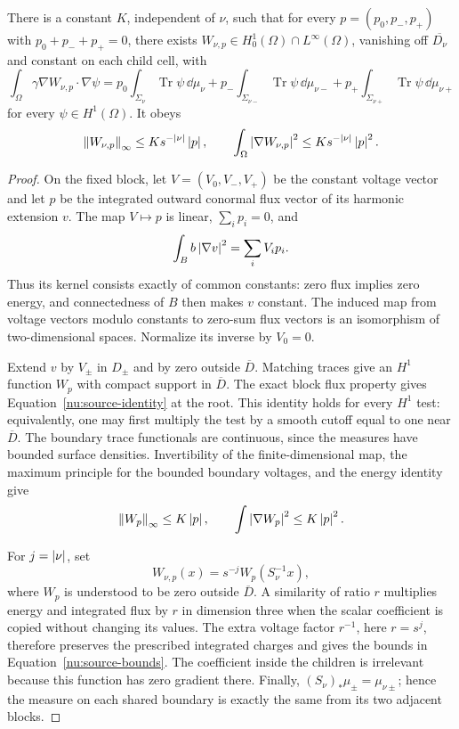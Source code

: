 \begin{lemma}\label{nu:source-lemma}
There is a constant \(K\), independent of \(\nu\), such that for
every \(p=(p_0,p_-,p_+)\) with \(p_0+p_-+p_+=0\), there exists
\(W_{\nu,p}\in H^1_0(\Omega)\cap L^\infty(\Omega)\), vanishing
off \(\overline{D_\nu}\) and constant on each child cell, with
\begin{equation}\label{nu:source-identity}
 \int_\Omega\gamma\nabla W_{\nu,p}\cdot\nabla\psi
 =p_0\int_{\Sigma_\nu}\operatorname{Tr}\psi\,\dd\mu_\nu
  +p_-\int_{\Sigma_{\nu-}}\operatorname{Tr}\psi\,\dd\mu_{\nu-}
  +p_+\int_{\Sigma_{\nu+}}\operatorname{Tr}\psi\,\dd\mu_{\nu+}
\end{equation}
for every \(\psi\in H^1(\Omega)\). It obeys
\begin{equation}\label{nu:source-bounds}
 \left\lVert W_{\nu,p}\right\rVert_\infty\le K s^{-\left\lvert \nu\right\rvert}\left\lvert p\right\rvert,
 \qquad
 \int_\Omega\left\lvert \nabla W_{\nu,p}\right\rvert^2
 \le K s^{-\left\lvert \nu\right\rvert}\left\lvert p\right\rvert^2.
\end{equation}
\end{lemma}

\begin{proof}
On the fixed block, let \(V=(V_0,V_-,V_+)\) be the constant voltage
vector and let \(p\) be the integrated outward conormal flux vector
of its harmonic extension \(v\). The map \(V\mapsto p\) is linear,
\(\sum_i p_i=0\), and
\[
 \int_B b\left\lvert \nabla v\right\rvert^2=\sum_i V_i p_i.
\]
Thus its kernel consists exactly of common constants: zero flux implies
zero energy, and connectedness of \(B\) then makes \(v\) constant.
The induced map from voltage vectors modulo constants to zero-sum flux
vectors is an isomorphism of two-dimensional spaces. Normalize its
inverse by \(V_0=0\).

Extend \(v\) by \(V_\pm\) in \(D_\pm\) and by zero outside
\(\overline D\). Matching traces give an \(H^1\) function
\(W_p\) with compact support in \(\overline D\).
The exact block flux property gives Equation~\eqref{nu:source-identity}
at the root. This identity holds for every \(H^1\) test: equivalently,
one may first multiply the test by a smooth cutoff equal to one near
\(\overline D\). The boundary trace functionals are continuous,
since the measures have bounded surface densities. Invertibility of
the finite-dimensional map, the maximum principle for the bounded
boundary voltages, and the energy identity give
\[
 \left\lVert W_p\right\rVert_\infty\le K\left\lvert p\right\rvert,
 \qquad \int\left\lvert \nabla W_p\right\rvert^2\le K\left\lvert p\right\rvert^2.
\]

For \(j=\left\lvert \nu\right\rvert\), set
\[
 W_{\nu,p}(x)=s^{-j}W_p(S_\nu^{-1}x),
\]
where \(W_p\) is understood to be zero outside \(\overline D\).
A similarity of ratio \(r\) multiplies energy and integrated flux
by \(r\) in dimension three when the scalar coefficient is copied
without changing its values. The extra voltage factor \(r^{-1}\),
here \(r=s^j\), therefore preserves the prescribed integrated
charges and gives the bounds in Equation~\eqref{nu:source-bounds}.
The coefficient inside the children is irrelevant because this
function has zero gradient there.
Finally,
\((S_\nu)_*\mu_\pm=\mu_{\nu\pm}\); hence the measure on each
shared boundary is exactly the same from its two adjacent blocks.
\end{proof}

